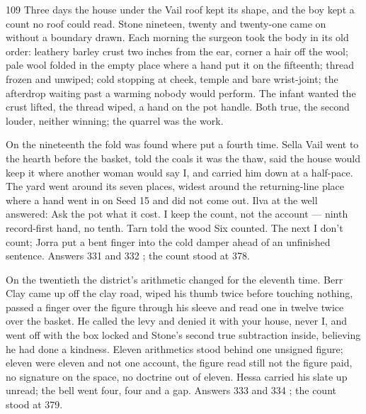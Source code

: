 
\scenebreak


\scenebreak


\scenebreak

\CRtailpiece
\begin{CRchronicle}{109}
Three days the house under the Vail roof kept its shape, and the boy kept a count no roof could read. Stone nineteen, twenty and twenty-one came on without a boundary drawn. Each morning the surgeon took the body in its old order: leathery barley crust two inches from the ear, corner a hair off the wool; pale wool folded in the empty place where a hand put it on the fifteenth; thread frozen and unwiped; cold stopping at cheek, temple and bare wrist-joint; the afterdrop waiting past a warming nobody would perform. The infant wanted the crust lifted, the thread wiped, a hand on the pot handle. Both true, the second louder, neither winning; the quarrel was the work.

On the nineteenth the fold was found where put a fourth time. Sella Vail went to the hearth before the basket, told the coals it was the thaw, said the house would keep it where another woman would say I, and carried him down at a half-pace. The yard went around its seven places, widest around the returning-line place where a hand went in on Seed 15 and did not come out. Ilva at the well answered: Ask the pot what it cost. I keep the count, not the account — ninth record-first hand, no tenth. Tarn told the wood Six counted. The next I don’t count; Jorra put a bent finger into the cold damper ahead of an unfinished sentence. Answers 331 and 332 ; the count stood at 378.

On the twentieth the district’s arithmetic changed for the eleventh time. Berr Clay came up off the clay road, wiped his thumb twice before touching nothing, passed a finger over the figure through his sleeve and read one in twelve twice over the basket. He called the levy and denied it with your house, never I, and went off with the box locked and Stone’s second true subtraction inside, believing he had done a kindness. Eleven arithmetics stood behind one unsigned figure; eleven were eleven and not one account, the figure read still not the figure paid, no signature on the space, no doctrine out of eleven. Hessa carried his slate up unread; the bell went four, four and a gap. Answers 333 and 334 ; the count stood at 379.


\end{CRchronicle}
